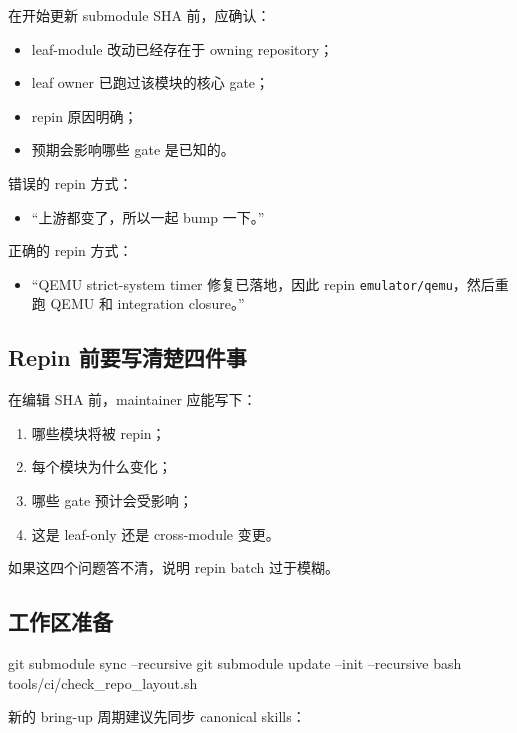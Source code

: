 \documentclass[UTF8,11pt,a4paper]{ctexart}
\begin{document}
在开始更新 submodule SHA 前，应确认：

\begin{itemize}
  \item leaf-module 改动已经存在于 owning repository；
  \item leaf owner 已跑过该模块的核心 gate；
  \item repin 原因明确；
  \item 预期会影响哪些 gate 是已知的。
\end{itemize}

错误的 repin 方式：

\begin{itemize}
  \item “上游都变了，所以一起 bump 一下。”
\end{itemize}

正确的 repin 方式：

\begin{itemize}
  \item “QEMU strict-system timer 修复已落地，因此 repin
  \texttt{emulator/qemu}，然后重跑 QEMU 和 integration closure。”
\end{itemize}

\subsection{Repin 前要写清楚四件事}

在编辑 SHA 前，maintainer 应能写下：

\begin{enumerate}
  \item 哪些模块将被 repin；
  \item 每个模块为什么变化；
  \item 哪些 gate 预计会受影响；
  \item 这是 leaf-only 还是 cross-module 变更。
\end{enumerate}

如果这四个问题答不清，说明 repin batch 过于模糊。

\subsection{工作区准备}

\begin{CodeBlock}
git submodule sync --recursive
git submodule update --init --recursive
bash tools/ci/check_repo_layout.sh
\end{CodeBlock}

新的 bring-up 周期建议先同步 canonical skills：
\end{document}
